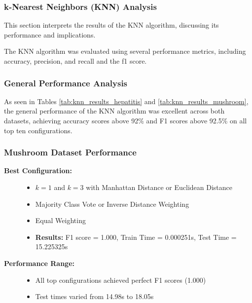 \subsubsection{k-Nearest Neighbors (KNN) Analysis}
\label{subsubsec:discussion-knn}

This section interprets the results of the KNN algorithm, discussing its performance and implications.

The KNN algorithm was evaluated using several performance metrics, including accuracy, precision, and recall and the f1 score.

\subsubsection*{General Performance Analysis}
As seen in Tables \ref{tab:knn_results_hepatitis} and \ref{tab:knn_results_mushroom}, the general performance of the KNN algorithm was excellent across both datasets,
achieving accuracy scores above 92\% and F1 scores above 92.5\% on all top ten configurations.

\subsubsection{Mushroom Dataset Performance}

\begin{description}
    \item[\textbf{Best Configuration:}]\leavevmode
        \begin{itemize}
            \item $k = 1$ and $k = 3$ with Manhattan Distance or Euclidean Distance
            \item Majority Class Vote or Inverse Distance Weighting
            \item Equal Weighting
            \item \textbf{Results:} F1 score = 1.000, Train Time = 0.000251s, Test Time = 15.225325s
        \end{itemize}
    
    \item[\textbf{Performance Range:}]\leavevmode
        \begin{itemize}
            \item All top configurations achieved perfect F1 scores (1.000)
            \item Test times varied from 14.98s to 18.05s
        \end{itemize}
\end{description}

